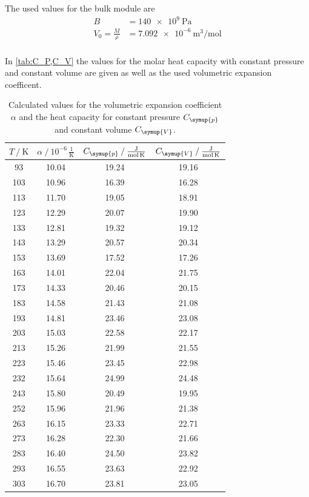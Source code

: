 The used values for the bulk module are 
\begin{align*}
  B &= \qty{140e9}{\pascal} \\
  V_0 = \frac{M}{\rho} &= \qty{7.092e-6}{\cubic\metre\per\mol} \\
\end{align*}

In \autoref{tab:C_P,C_V} the values for the molar heat capacity with constant pressure and constant volume are given as well as the used volumetric expansion
coefficent.

\begin{table}
  \centering
  \caption{Calculated values for the volumetric expansion coefficient $\alpha$ and the heat capacity for constant pressure $C_{\symup{p}}$ and constant %
  volume $C_{\symup{V}}$.}
  \label{tab:C_P,C_V}
  \begin{tabular}{S S S S}
    \toprule
    {$T \mathbin{/} \unit{\kelvin}$} & {$\alpha \mathbin{/} 10^{-6}\,\frac{1}{\unit{\kelvin}}$} & {$C_{\symup{p}} \mathbin{/} \frac{\unit{\joule}}{\unit{\mol\kelvin}}$} & %
    {$C_{\symup{V}} \mathbin{/} \frac{\unit{\joule}}{\unit{\mol\kelvin}}$} \\
    \midrule
    93  & 10.04 & 19.24 & 19.16 \\
    103 & 10.96 & 16.39 & 16.28 \\
    113 & 11.70 & 19.05 & 18.91 \\
    123 & 12.29 & 20.07 & 19.90 \\
    133 & 12.81 & 19.32 & 19.12 \\
    143 & 13.29 & 20.57 & 20.34 \\
    153 & 13.69 & 17.52 & 17.26 \\
    163 & 14.01 & 22.04 & 21.75 \\
    173 & 14.33 & 20.46 & 20.15 \\
    183 & 14.58 & 21.43 & 21.08 \\
    193 & 14.81 & 23.46 & 23.08 \\
    203 & 15.03 & 22.58 & 22.17 \\
    213 & 15.26 & 21.99 & 21.55 \\
    223 & 15.46 & 23.45 & 22.98 \\
    232 & 15.64 & 24.99 & 24.48 \\
    243 & 15.80 & 20.49 & 19.95 \\
    252 & 15.96 & 21.96 & 21.38 \\
    263 & 16.15 & 23.33 & 22.71 \\
    273 & 16.28 & 22.30 & 21.66 \\
    283 & 16.40 & 24.50 & 23.82 \\
    293 & 16.55 & 23.63 & 22.92 \\
    303 & 16.70 & 23.81 & 23.05 \\
    \bottomrule
  \end{tabular}
\end{table}

